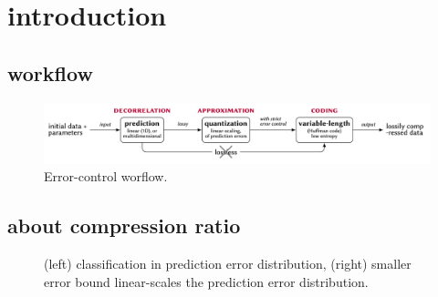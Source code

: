 \section{introduction}

\subsection{workflow}

\begin{figure}
\centering
\includegraphics{fig/standalone_errorControl.png}
\caption{Error-control worflow.}
\end{figure}

\subsection{about compression ratio}

\begin{figure}\centering

\caption{(left) classification in prediction error distribution, (right) smaller error bound linear-scales the prediction error distribution.}
\end{figure}


